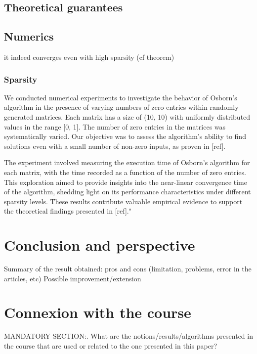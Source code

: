 
\subsection{Theoretical guarantees}

\subsection{Numerics}

it indeed converges even with high sparsity (cf theorem)

\subsubsection{Sparsity}

We conducted numerical experiments to investigate the behavior of Osborn's algorithm in the presence of varying numbers of zero entries within randomly generated matrices. Each matrix has a size of (10, 10) with uniformly distributed values in the range [0, 1]. The number of zero entries in the matrices was systematically varied. Our objective was to assess the algorithm's ability to find solutions even with a small number of non-zero inputs, as proven in [ref].

The experiment involved measuring the execution time of Osborn's algorithm for each matrix, with the time recorded as a function of the number of zero entries. This exploration aimed to provide insights into the near-linear convergence time of the algorithm, shedding light on its performance characteristics under different sparsity levels. These results contribute valuable empirical evidence to support the theoretical findings presented in [ref]."



\section{Conclusion and perspective}

Summary of the result obtained: pros and cons (limitation, problems, error in the articles, etc)
Possible improvement/extension 

\section{Connexion with the course}

MANDATORY SECTION:. What are the notions/results/algorithms presented in the course that are used or related to the one presented in this paper?

\listoftodos{}

\printbibliography[heading=bibintoc]

